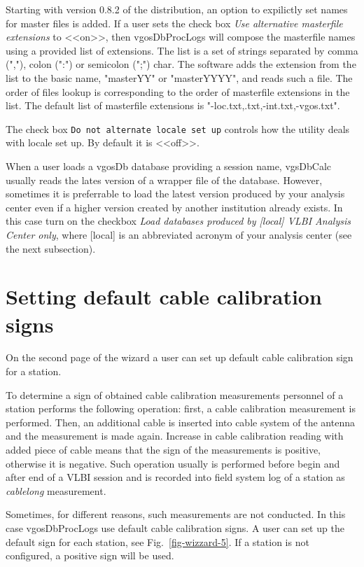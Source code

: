 \documentclass [10pt,letterpaper]{report}
\begin{document}
Starting with version 0.8.2 of the distribution, an option to expilictly set names
for master files is added. If a user sets the check box {\sl Use alternative
masterfile extensions} to <<on>>, then vgosDbProcLogs will compose the masterfile names
using a provided list of extensions. The list is a set of strings separated by
comma (","), colon (":") or semicolon (";") char. The software adds the extension
from the list to the basic name, "masterYY" or "masterYYYY", and reads such a file.
The order of files lookup is corresponding to the order of masterfile
extensions in the list. The default list of masterfile extensions is
"-loc.txt,.txt,-int.txt,-vgos.txt".

The check box {\tt Do not alternate locale set up} controls how the utility
deals with locale set up. By default it is <<off>>.

When a user loads a vgosDb database providing a session name, vgsDbCalc
usually reads the lates version of a wrapper file of the database.
However, sometimes it is preferrable to load the latest version produced
by your analysis center even if a higher version created by another
institution already exists. In this case turn on the checkbox
{\sl Load databases produced by [local] VLBI Analysis Center only}, where
[local] is an abbreviated acronym of your analysis center (see the next
subsection).


\section{Setting default cable calibration signs}
\label{config_cablecal_signs}
On the second page of the wizard a user can set up default cable calibration
sign for a station.

To determine a sign of obtained cable calibration measurements personnel
of a station performs the following operation: first, a cable calibration
measurement is performed. Then, an additional cable is inserted into cable
system of the antenna and the measurement is made again. Increase in cable
calibration reading with added piece of cable means that the sign of
the measurements is positive, otherwise it is negative. Such operation
usually is performed before begin and after end of a VLBI session and is
recorded into field system log of a station as \emph{cablelong} measurement.

Sometimes, for different reasons, such measurements are not conducted. In this
case vgosDbProcLogs use default cable calibration signs. A user can set up the
default sign for each station, see Fig.~\ref{fig-wizzard-5}. If a station is
not configured, a positive sign will be used.
\end{document}
